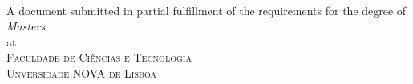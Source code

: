 \begin{titlepage}
  \vspace*{5cm}
  \makeatletter
  \begin{center}
    \begin{Huge}
      \@title
    \end{Huge}\\[0.1cm]
    \@author
    \vfill
    A document submitted in partial fulfillment
    of the requirements for the degree of\\
    \emph{Masters}\\
    at\\
    \textsc{Faculdade de Ciências e Tecnologia\\Unversidade NOVA de Lisboa}
  \end{center}
  \makeatother
\end{titlepage}

\newpage
\null
\thispagestyle{empty}
\newpage

